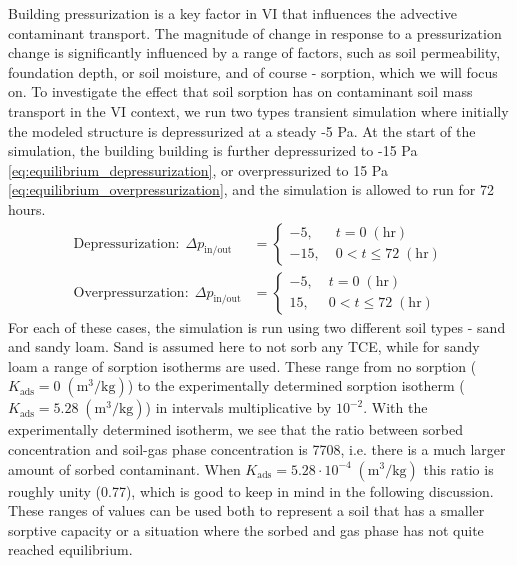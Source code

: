 Building pressurization is a key factor in VI that influences the advective contaminant transport.
The magnitude of change in response to a pressurization change is significantly influenced by a range of factors, such as soil permeability, foundation depth, or soil moisture, and of course - sorption, which we will focus on.
To investigate the effect that soil sorption has on contaminant soil mass transport in the VI context, we run two types transient simulation where initially the modeled structure is depressurized at a steady -5 Pa.
At the start of the simulation, the building building is further depressurized to -15 Pa \eqref{eq:equilibrium_depressurization}, or overpressurized to 15 Pa \eqref{eq:equilibrium_overpressurization}, and the simulation is allowed to run for 72 hours. %
\begin{align}
  \text{Depressurization}: \; \Delta p_\mathrm{in/out} &= \begin{cases}
    -5, \; &t = 0 \; \mathrm{(hr)} \\
    -15, \; &0 < t \leq 72 \; \mathrm{(hr)}
\end{cases}\label{eq:equilibrium_depressurization}\\
\text{Overpressurzation}: \; \Delta p_\mathrm{in/out} &= \begin{cases}
  -5, \; &t = 0 \; \mathrm{(hr)} \\
  15, \; &0 < t \leq 72 \; \mathrm{(hr)}
\end{cases}\label{eq:equilibrium_overpressurization}
\end{align}
For each of these cases, the simulation is run using two different soil types - sand and sandy loam.
Sand is assumed here to not sorb any TCE, while for sandy loam a range of sorption isotherms are used.
These range from no sorption ($K_\mathrm{ads} = 0 \; \mathrm{(m^3/kg)}$) to the experimentally determined sorption isotherm ($K_\mathrm{ads} = 5.28 \; \mathrm{(m^3/kg)}$) in intervals multiplicative by $10^{-2}$. With the experimentally determined isotherm, we see that the ratio between sorbed concentration and soil-gas phase concentration is 7708, i.e. there is a much larger amount of sorbed contaminant.
When $K_\mathrm{ads} = 5.28 \cdot 10^{-4} \; \mathrm{(m^3/kg)}$ this ratio is roughly unity (0.77), which is good to keep in mind in the following discussion. %
These ranges of values can be used both to represent a soil that has a smaller sorptive capacity or a situation where the sorbed and gas phase has not quite reached equilibrium.\par

